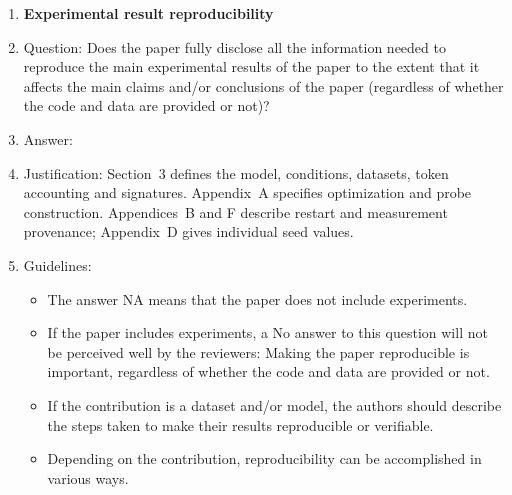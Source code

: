 \begin{enumerate}
\item {\bf Experimental result reproducibility}
    \item[] Question: Does the paper fully disclose all the information needed to reproduce the main experimental results of the paper to the extent that it affects the main claims and/or conclusions of the paper (regardless of whether the code and data are provided or not)?
    \item[] Answer: \answerYes{}
    \item[] Justification: Section~3 defines the model, conditions, datasets, token accounting and signatures. Appendix~A specifies optimization and probe construction. Appendices~B and F describe restart and measurement provenance; Appendix~D gives individual seed values.
    \item[] Guidelines:
    \begin{itemize}
        \item The answer NA means that the paper does not include experiments.
        \item If the paper includes experiments, a No answer to this question will not be perceived well by the reviewers: Making the paper reproducible is important, regardless of whether the code and data are provided or not.
        \item If the contribution is a dataset and/or model, the authors should describe the steps taken to make their results reproducible or verifiable.
        \item Depending on the contribution, reproducibility can be accomplished in various ways.
    \end{itemize}


\end{enumerate}
